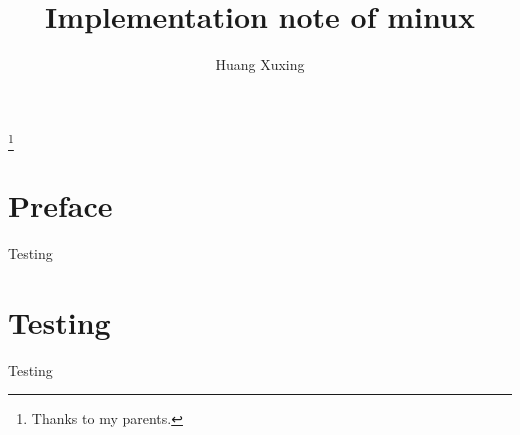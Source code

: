 \documentclass{book}
\begin{document}
\pagestyle{empty}
\title{\textbf{Implementation note of minux}}
\author{Huang Xuxing}



\maketitle


\thispagestyle{empty}
\thanks{Thanks to my parents.}
\newpage




\pagestyle{fancy}
\fancyhf{}
\lhead[]{\thepage}
\rhead[\thepage]{}


\doublespacing



\chapter*{Preface}

Testing


\newpage
\thispagestyle{empty}

\chapter{Testing}

Testing

\newpage
\renewcommand{\cftchapdotsep}{\cftdotsep}
\tableofcontents
\end{document}
